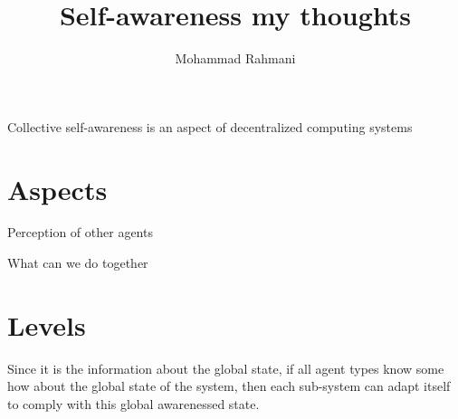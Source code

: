 \documentclass{article}
\begin{document}
	
	\title{Self-awareness my thoughts}
	\author{Mohammad Rahmani}
	\date{}
	\maketitle
	Collective self-awareness is an aspect of decentralized computing systems
	\section{Aspects}
		\item Perception of other agents
		\item What can we do together
	\section{Levels}
	Since it is the information about the global state, if all agent types know some how about the global state of the system, then each sub-system can adapt itself to comply with this global awarenessed state.
	
\end{document}
